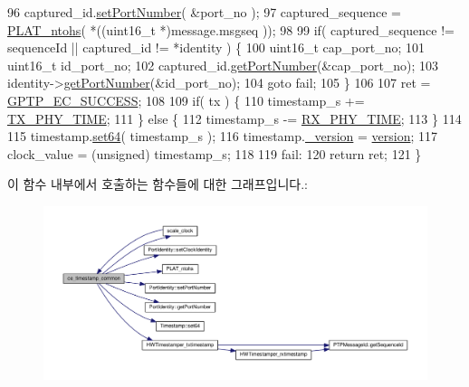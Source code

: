\begin{DoxyCode}
96     captured\_id.\hyperlink{class_port_identity_a4278f191d797db9ab76799f43779498b}{setPortNumber}( &port\_no );
97     captured\_sequence = \hyperlink{linux_2src_2platform_8cpp_a6b8f3e7b87b66fa774a07ddc67f883a7}{PLAT\_ntohs}( *((uint16\_t *)message.msgseq ));
98 
99     \textcolor{keywordflow}{if}( captured\_sequence != sequenceId || captured\_id != *identity ) \{
100         uint16\_t cap\_port\_no;
101         uint16\_t id\_port\_no;
102         captured\_id.\hyperlink{class_port_identity_ad9d12804c253a7c8138a4bfbe87eddba}{getPortNumber}(&cap\_port\_no);
103         identity->\hyperlink{class_port_identity_ad9d12804c253a7c8138a4bfbe87eddba}{getPortNumber}(&id\_port\_no);
104         \textcolor{keywordflow}{goto} fail;
105     \}
106 
107     ret = \hyperlink{ieee1588_8hpp_a57ed3a54df25c6db88b00f685f517920}{GPTP\_EC\_SUCCESS};
108 
109     \textcolor{keywordflow}{if}( tx ) \{
110         timestamp\_s += \hyperlink{linux__hal__intelce_8cpp_a42ba138c97569ebeb802fc3beb01c668}{TX\_PHY\_TIME};
111     \} \textcolor{keywordflow}{else} \{
112         timestamp\_s -= \hyperlink{linux__hal__intelce_8cpp_ac12c462a772bab79cc693c71bc906496}{RX\_PHY\_TIME};
113     \}
114 
115     timestamp.\hyperlink{class_timestamp_aa62b073d8565fc6536122e8c27351f5c}{set64}( timestamp\_s );
116     timestamp.\hyperlink{class_timestamp_a8fab72cfd922b5757580642c2309e9bd}{\_version} = \hyperlink{class_common_timestamper_ab22abc2906422da61885ac6c8e6a1a59}{version};
117     clock\_value = (unsigned) timestamp\_s;
118 
119  fail:
120     \textcolor{keywordflow}{return} ret;
121 \}
\end{DoxyCode}


이 함수 내부에서 호출하는 함수들에 대한 그래프입니다.\+:
\nopagebreak
\begin{figure}[H]
\begin{center}
\leavevmode
\includegraphics[width=350pt]{class_linux_timestamper_intel_c_e_aea6548c8f8bdc0cf5c5c1a2a56e14212_cgraph}
\end{center}
\end{figure}




